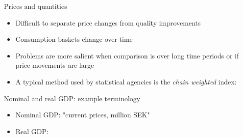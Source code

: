 \documentclass[10pt]{beamer}
\begin{document}
\begin{frame}{Prices and quantities}
\small{
\begin{itemize}
    \item Difficult to separate price changes from quality improvements \medskip
    \item Consumption baskets change over time
     \medskip
    \item Problems are more salient when comparison is over long time periods or if price movements are large \medskip
    \item A typical method used by statistical agencies is the \emph{chain weighted} index:
\end{itemize}
}
\end{frame}


\begin{frame}{Nominal and real GDP: example terminology}
\small{
\begin{itemize}
    \item Nominal GDP: "current prices, million SEK" \bigskip
    \item Real GDP:
\end{itemize}
}
\end{frame}
\end{document}
